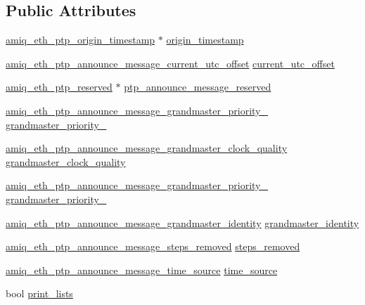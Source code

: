 \subsection*{Public Attributes}
\begin{DoxyCompactItemize}
\item 
\hyperlink{amiq__eth__types_8cpp_add82721f4ff373d2b82269bbf5941032}{amiq\_\-eth\_\-ptp\_\-origin\_\-timestamp} $\ast$ \hyperlink{classamiq__eth__packet__ptp__announce__message_a8eb45448fa61158d4a03b9d3e94e1271}{origin\_\-timestamp}
\item 
\hyperlink{amiq__eth__types_8cpp_a2e4008c65de41c88cb0a31e7da8c5d12}{amiq\_\-eth\_\-ptp\_\-announce\_\-message\_\-current\_\-utc\_\-offset} \hyperlink{classamiq__eth__packet__ptp__announce__message_aa0d05c2c4d2e45e899dd2e2d921c790a}{current\_\-utc\_\-offset}
\item 
\hyperlink{amiq__eth__types_8cpp_ad10b57e0e913c9526272e60a5d0b7402}{amiq\_\-eth\_\-ptp\_\-reserved} $\ast$ \hyperlink{classamiq__eth__packet__ptp__announce__message_ad4949245331aa207e7d5780c34c79d8e}{ptp\_\-announce\_\-message\_\-reserved}
\item 
\hyperlink{amiq__eth__types_8cpp_a7facc1b3ea33d79c32845cd7464c0857}{amiq\_\-eth\_\-ptp\_\-announce\_\-message\_\-grandmaster\_\-priority\_} \hyperlink{classamiq__eth__packet__ptp__announce__message_ae258080e7315ca186aea221d7e41f9a4}{grandmaster\_\-priority\_}
\item 
\hyperlink{amiq__eth__types_8cpp_aef318716376eb3c45f5ccdf0158ec4eb}{amiq\_\-eth\_\-ptp\_\-announce\_\-message\_\-grandmaster\_\-clock\_\-quality} \hyperlink{classamiq__eth__packet__ptp__announce__message_a866b981ee7e7f2676da3489c03471ce3}{grandmaster\_\-clock\_\-quality}
\item 
\hyperlink{amiq__eth__types_8cpp_ae7c7c3f73f55a2d63fba35722704b7f0}{amiq\_\-eth\_\-ptp\_\-announce\_\-message\_\-grandmaster\_\-priority\_} \hyperlink{classamiq__eth__packet__ptp__announce__message_a4f6c2c42d48173f1b7573aaf6aa63d01}{grandmaster\_\-priority\_}
\item 
\hyperlink{amiq__eth__types_8cpp_ab8d5aeef81a214d4cda947f8bd4bd609}{amiq\_\-eth\_\-ptp\_\-announce\_\-message\_\-grandmaster\_\-identity} \hyperlink{classamiq__eth__packet__ptp__announce__message_af5f4614eb76c459fe344b070103c11e7}{grandmaster\_\-identity}
\item 
\hyperlink{amiq__eth__types_8cpp_a6a730bd06108652c67c16032f3157369}{amiq\_\-eth\_\-ptp\_\-announce\_\-message\_\-steps\_\-removed} \hyperlink{classamiq__eth__packet__ptp__announce__message_a3bbde8f5edb3a9b9b606a489620375a8}{steps\_\-removed}
\item 
\hyperlink{amiq__eth__types_8cpp_a4df18979e2279ef0f4a378507a506d96}{amiq\_\-eth\_\-ptp\_\-announce\_\-message\_\-time\_\-source} \hyperlink{classamiq__eth__packet__ptp__announce__message_a1cbc8a5fe3f254291ec7787daf4c1054}{time\_\-source}
\item 
bool \hyperlink{classamiq__eth__packet__ptp__announce__message_abdea2756813db75cbf294607dbc8a78f}{print\_\-lists}
\end{DoxyCompactItemize}


